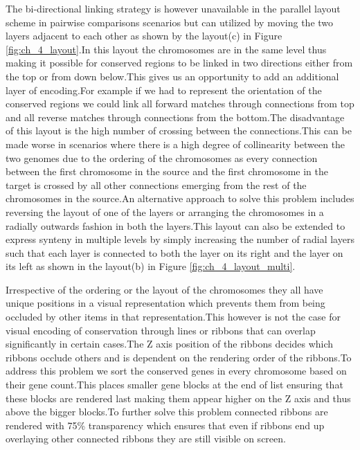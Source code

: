 The bi-directional linking strategy is however unavailable in the parallel layout scheme in pairwise comparisons scenarios but can utilized by moving the two layers adjacent to each other as shown by the layout(c) in Figure \ref{fig:ch_4_layout}.In this layout the chromosomes are in the same level thus making it possible for conserved regions to be linked in two directions either from the top or from down below.This gives us an opportunity to add an additional layer of encoding.For example if we had to represent the orientation of the conserved regions we could link all forward matches through connections from top and all reverse matches through connections from the bottom.The disadvantage of this layout is the high number of crossing between the connections.This can be made worse in scenarios where there is a high degree of collinearity between the two genomes due to the ordering of the chromosomes as every connection between the first chromosome in the source and the first chromosome in the target is crossed by all other connections emerging from the rest of the chromosomes in the source.An alternative approach to solve this problem includes reversing the layout of one of the layers or arranging the chromosomes in a radially outwards fashion in  both the layers.This layout can also be extended to express synteny in multiple levels by simply increasing the number of radial layers such that each layer is connected to both the layer on its right and the layer on its left as shown in the layout(b) in Figure \ref{fig:ch_4_layout_multi}.



Irrespective of the ordering or the layout of the chromosomes they all have unique positions in a visual representation which prevents them from being occluded by other items in that representation.This however is not the case for  visual encoding of conservation through lines or ribbons that can overlap significantly in certain cases.The Z axis position of the ribbons decides which ribbons occlude others and is dependent on the rendering order of the ribbons.To address this problem we sort the conserved genes in every chromosome based on their gene count.This places smaller gene blocks at the end of list ensuring that these blocks are rendered last making them appear higher on the Z axis and thus above the bigger blocks.To further solve this problem connected ribbons are rendered with 75\% transparency which ensures that even if ribbons end up overlaying other connected ribbons they are still visible on screen.

